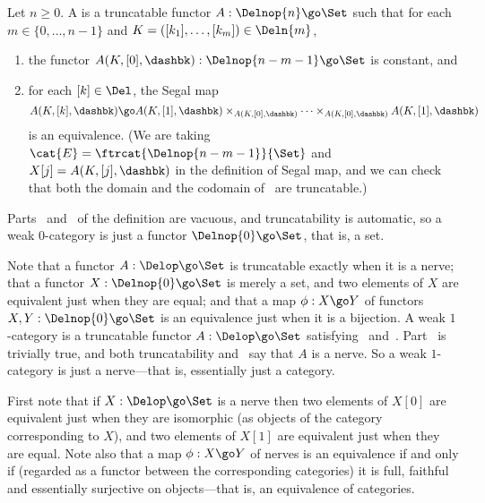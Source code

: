 
Let $n\geq 0$.  A  is a truncatable functor $A:
\Delnop{n} \go \Set$ such that for each $m\in \{0, \ldots, n-1\}$ and
$K=([k_1], \ldots, [k_m]) \in \Deln{m}$,
%
\begin{enumerate}
\item 	\label{part:defn:degen}
the functor
$
A(K, [0], \dashbk): \Delnop{n-m-1} \go \Set
$ 
is constant, and
\item 	\label{part:defn:main} 
for each $[k]\in\Del$, the Segal map
%
\begin{equation}	\label{eq:defining}
A(K, [k], \dashbk) \go 
A(K, [1],\dashbk) \times_{A(K, [0],\dashbk)} \cdots 
\times_{A(K, [0],\dashbk)} A(K, [1],\dashbk)
\end{equation}
%
is an equivalence.  (We are taking $\cat{E}=\ftrcat{\Delnop{n-m-1}}{\Set}$
and $X[j]=A(K,[j],\dashbk)$ in the definition of Segal map, and we can check
that both the domain and the codomain of~ are truncatable.)
\end{enumerate}





\clearpage





Parts~ and~ of the definition are
vacuous, and truncatability is automatic, so a weak $0$-category is just a
functor $\Delnop{0}\go\Set$, that is, a set.




Note that a functor $A: \Delop \go \Set$ is truncatable exactly when it is a
nerve; that a functor $X: \Delnop{0} \go \Set$ is merely a set, and two
elements of $X$ are equivalent just when they are equal; and that a map
$\phi: X \go Y$ of functors $X, Y: \Delnop{0} \go \Set$ is an equivalence
just when it is a bijection.  A weak $1$-category is a truncatable functor
$A: \Delop \go \Set$ satisfying~
and~.  Part~ is trivially true,
and both truncatability and~ say that $A$ is a nerve.
So a weak $1$-category is just a nerve---that is, essentially just a
category.



First note that if $X: \Delop \go \Set$ is a nerve then two elements of
$X[0]$ are equivalent just when they are isomorphic (as objects of
the category corresponding to $X$), and two elements of $X[1]$ are equivalent
just when they are equal.  Note also that a map $\phi: X \go Y$ of nerves is
an equivalence if and only if (regarded as a functor between the
corresponding categories) it is full, faithful and essentially surjective on
objects---that is, an equivalence of categories.

